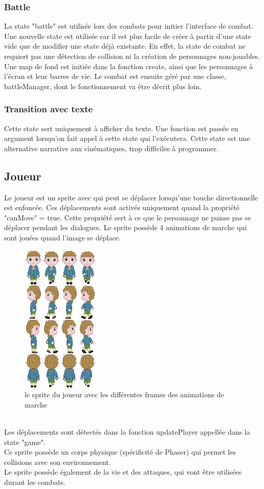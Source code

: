 \documentclass[11pt]{article}
\begin{document}
\subsubsection{Battle}
La state "battle" est utilisée lors des combats pour initier l'interface de combat. Une nouvelle state est utilisée car il est plus facile de créer à partir d'une state vide que de modifier une state déjà existante. En effet, la state de combat ne requiert pas une détection de collision ni la création de personnages non-jouables.
\\ Une map de fond est initiée dans la fonction create, ainsi que les personnages à l'écran et leur barres de vie. Le combat est ensuite géré par une classe, battleManager, dont le fonctionnement va être décrit plus loin.
\subsubsection{Transition avec texte}
Cette state sert uniquement à afficher du texte. Une fonction est passée en argument lorsqu'on fait appel à cette state qui l'exécutera. Cette state est une alternative narrative aux cinématiques, trop difficiles à programmer.  
\subsection{Joueur}
Le joueur est un sprite avec qui peut se déplacer lorsqu'une touche directionnelle est enfoncée. Ces déplacements sont activés uniquement quand la propriété "canMove" = true. Cette propriété sert à ce que le personnage ne puisse pas se déplacer pendant les dialogues. Le sprite possède 4 animations de marche qui sont jouées quand l'image se déplace.\\
\begin{figure}[h]
\includegraphics[scale=0.5]{candideSprite}
\centering
\caption{le sprite du joueur avec les différentes frames des animations de marche}
\end{figure}
\\Les déplacements sont détectés dans la fonction updatePlayer appellée dans la state "game".
\\Ce sprite possède un corps physique (spécificité de Phaser) qui permet les collisions avec son environnement.
\\Le sprite possède également de la vie et des attaques, qui vont être utilisées durant les combats. 
\end{document}
